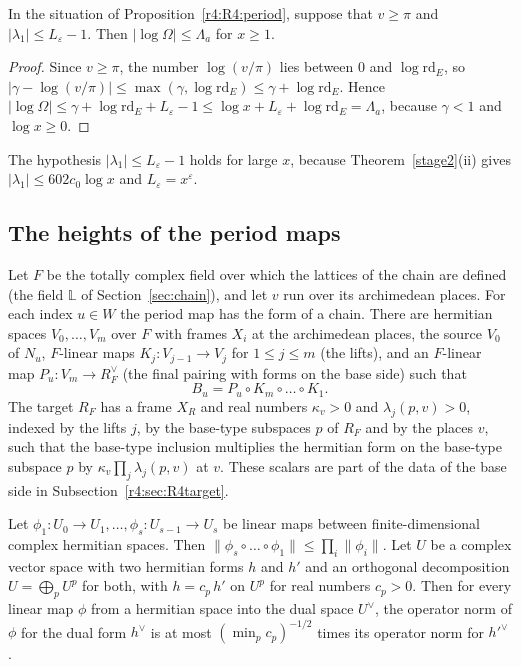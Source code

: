 \begin{lemma}\label{r4:R4:Omegasize}
In the situation of Proposition~\ref{r4:R4:period}, suppose that $v\ge\pi$ and $\lvert\lambda_1\rvert\le L_\varepsilon-1$. Then $\lvert\log\Omega\rvert\le\Lambda_a$ for $x\ge1$.
\end{lemma}

\begin{proof}
Since $v\ge\pi$, the number $\log(v/\pi)$ lies between $0$ and $\log\mathrm{rd}_E$, so $\lvert\gamma-\log(v/\pi)\rvert\le\max(\gamma,\log\mathrm{rd}_E)\le\gamma+\log\mathrm{rd}_E$. Hence $\lvert\log\Omega\rvert\le\gamma+\log\mathrm{rd}_E+L_\varepsilon-1\le\log x+L_\varepsilon+\log\mathrm{rd}_E=\Lambda_a$, because $\gamma<1$ and $\log x\ge0$.
\end{proof}

The hypothesis $\lvert\lambda_1\rvert\le L_\varepsilon-1$ holds for large $x$, because Theorem~\ref{stage2}(ii) gives $\lvert\lambda_1\rvert\le602c_0\log x$ and $L_\varepsilon=x^\varepsilon$.

\subsection{The heights of the period maps}\label{r4:sec:R4height}

Let $F$ be the totally complex field over which the lattices of the chain are defined (the field $\mathbb L$ of Section~\ref{sec:chain}), and let $v$ run over its archimedean places. For each index $u\in W$ the period map has the form of a chain. There are hermitian spaces $V_0,\dots,V_m$ over $F$ with frames $X_i$ at the archimedean places, the source $V_0$ of $N_u$, $F$-linear maps $K_j\colon V_{j-1}\to V_j$ for $1\le j\le m$ (the lifts), and an $F$-linear map $P_u\colon V_m\to R_F^{\vee}$ (the final pairing with forms on the base side) such that
\begin{equation}\label{r4:R4:chain}
B_u=P_u\circ K_m\circ\dots\circ K_1 .
\end{equation}
The target $R_F$ has a frame $X_R$ and real numbers $\kappa_v>0$ and $\lambda_j(p,v)>0$, indexed by the lifts $j$, by the base-type subspaces $p$ of $R_F$ and by the places $v$, such that the base-type inclusion multiplies the hermitian form on the base-type subspace $p$ by $\kappa_v\prod_j\lambda_j(p,v)$ at $v$. These scalars are part of the data of the base side in Subsection~\ref{r4:sec:R4target}.

\begin{lemma}\label{r4:R4:composite}
Let $\phi_1\colon U_0\to U_1,\dots,\phi_s\colon U_{s-1}\to U_s$ be linear maps between finite-dimensional complex hermitian spaces. Then $\lVert\phi_s\circ\dots\circ\phi_1\rVert\le\prod_i\lVert\phi_i\rVert$. Let $U$ be a complex vector space with two hermitian forms $h$ and $h'$ and an orthogonal decomposition $U=\bigoplus_pU^p$ for both, with $h=c_p\,h'$ on $U^p$ for real numbers $c_p>0$. Then for every linear map $\phi$ from a hermitian space into the dual space $U^\vee$, the operator norm of $\phi$ for the dual form $h^\vee$ is at most $(\min_pc_p)^{-1/2}$ times its operator norm for $h'^\vee$.
\end{lemma}

